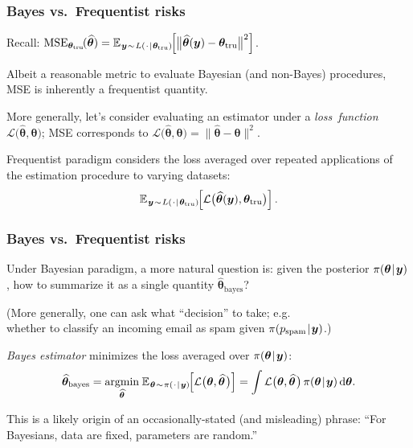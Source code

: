\documentclass[18pt]{beamer}
\newcommand{\defineTightSpacing}{%
	\setlength{\abovedisplayskip}{.25\baselineskip}%
	\setlength{\belowdisplayskip}{.25\baselineskip}%
}
\renewcommand{\textsc}[1]{{\small \MakeUppercase{#1}}}
\newcommand{\given}{\thinnerspace | \thinnerspace}
\newcommand{\diff}{\operatorname{\mathrm{d}}\!{}}
\DeclareMathOperator*{\argmin}{argmin}
\newcommand{\thinnerspace}{\mskip.5\thinmuskip}
\newcommand{\expectation}{\mathbb{E}}
\newcommand{\truthSub}{\mathrm{tru}}
\newcommand{\density}{\operatorname{\pi}}
\newcommand{\likelihood}{L}
\newcommand{\by}{\bm{y}}
\newcommand{\btheta}{\bm{\theta}}
\newcommand{\loss}{\mathcal{L}}
\begin{document}
\begin{frame}
\frametitle{Bayes vs.\ Frequentist risks}
Recall: 
$\displaystyle 
\operatorname{MSE}_{\btheta_\truthSub\!}(\widehat{\btheta})
	= \expectation_{\thinnerspace \by \thinnerspace \sim \thinnerspace  \likelihood(\thinnerspace \cdot \given \btheta_\truthSub)\!}\!\left[
		\big\| \widehat{\btheta}(\by) - \btheta_\truthSub \big\|^2
	\right]$.
	
\pause
\smallskip
Albeit a reasonable metric to evaluate Bayesian (and non-Bayes) procedures, \textsc{MSE} is inherently a frequentist quantity. 

\pause
\smallskip
More generally, let's consider evaluating an estimator under a \textit{loss~function} $\loss\big(\widehat{\btheta}, \btheta\big)$; \textsc{MSE} corresponds to $\loss\big(\widehat{\btheta}, \btheta\big) = \| \widehat{\btheta} - \btheta \|^2$.

\pause
\smallskip
Frequentist paradigm considers the loss averaged over repeated applications of the estimation procedure to varying datasets: %
\begin{equation*} \defineTightSpacing%
\expectation_{\thinnerspace \by \thinnerspace \sim \thinnerspace  \likelihood(\thinnerspace \cdot \given \btheta_\truthSub)\!}\!\left[
		\loss\big(\widehat{\btheta}(\by), \btheta_\truthSub \big)
	\right].
\end{equation*}
\end{frame}


\begin{frame}
\frametitle{Bayes vs.\ Frequentist risks}
Under Bayesian paradigm, a more natural question is: given the posterior $\density(\btheta \given \by)$, how to summarize it as a single quantity $\widehat{\btheta}_{\textrm{bayes}}$?

\pause
(More generally, one can ask what ``decision'' to take; e.g.\ \\
\hphantom{(}whether to classify an incoming email as spam given $\density(p_\mathrm{spam} \given \by)$.)

\pause
\smallskip
\textit{Bayes estimator} minimizes the loss averaged over $\density(\btheta \given \by)$:
\begin{equation*} \defineTightSpacing%
\widehat{\btheta}_{\textrm{bayes}} =
	\argmin_{\widehat{\btheta}} \thinnerspace \expectation_{\thinnerspace \btheta \thinnerspace \sim \thinnerspace \density(\thinnerspace \cdot \given \by)\!}\!\left[
		\loss\big(\btheta, \widehat{\btheta} \thinnerspace \big)
	\right]
	= \int \loss\big(\btheta, \widehat{\btheta} \thinnerspace \big) \density(\btheta \given \by) \diff \btheta.
\end{equation*}

\pause
\smallskip
This is a likely origin of an occasionally-stated (and misleading) phrase: 
``For Bayesians, data are fixed, parameters are random.'' 
\end{frame}
\end{document}
